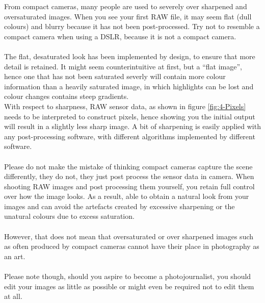 From compact cameras, many people are used to severely over sharpened and oversaturated images. When you see your first \gls{RAW} file, it may seem flat (dull colours) and blurry because it has not been post-processed. Try not to resemble a compact camera when using a \gls{DSLR}, because it is not a compact camera.
\\
\\
The flat, desaturated look has been implemented by design, to ensure that more detail is retained. It might seem counterintuitive at first, but a ``flat image'', hence one that has not been saturated severly will contain more colour information than a heavily saturated image, in which highlights can be lost and colour changes contains steep gradients.
\\
With respect to sharpness, \gls{RAW} sensor data, as shown in figure \ref{fig:4-Pixels} needs to be interpreted to construct pixels, hence showing you the initial output will result in a slightly less sharp image. A bit of sharpening is easily applied with any post-processing software, with different algorithms implemented by different software.
\\
\\
Please do not make the mistake of thinking compact cameras capture the scene differently, they do not, they just post process the sensor data in camera. When shooting \gls{RAW} images and post processing them yourself, you retain full control over how the image looks. As a result, able to obtain a natural look from your images and can avoid the artefacts created by excessive sharpening or the unatural colours due to excess saturation.
\\
\\
However, that does not mean that oversaturated or over sharpened images such as often produced by compact cameras cannot have their place in photography as an art.
\\
\\
Please note though, should you aspire to become a \gls{photojournalist}, you should edit your images as little as possible or might even be required not to edit them at all.